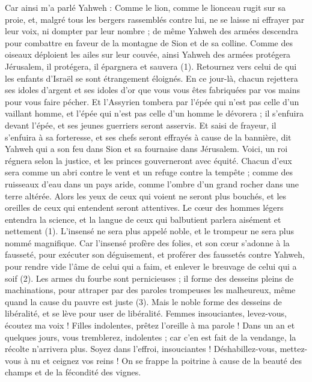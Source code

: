 \begin{multicols}{2}
{Car ainsi m'a parlé Yahweh : Comme le lion, comme le lionceau rugit sur sa proie, et, malgré tous les bergers rassemblés contre lui, ne se laisse ni effrayer par leur voix, ni dompter par leur nombre ; de même Yahweh des armées descendra pour combattre en faveur de la montagne de Sion et de sa colline.
Comme des oiseaux déploient les ailes sur leur couvée, ainsi Yahweh des armées protégera Jérusalem, il protégera, il épargnera et sauvera (1).
Retournez vers celui de qui les enfants d'Israël se sont étrangement éloignés.
En ce jour-là, chacun rejettera ses idoles d’argent et ses idoles d’or que vous vous êtes fabriquées par vos mains pour vous faire pécher.
Et l'Assyrien tombera par l'épée qui n’est pas celle d'un vaillant homme, et l'épée qui n'est pas celle d’un homme le dévorera ; il s'enfuira devant l'épée, et ses jeunes guerriers seront asservis.
Et saisi de frayeur, il s’enfuira à sa forteresse, et ses chefs seront effrayés à cause de la bannière, dit Yahweh qui a son feu dans Sion et sa fournaise dans Jérusalem.
\VerseOne{}Voici, un roi régnera selon la justice, et les princes gouverneront avec équité.
Chacun d’eux sera comme un abri contre le vent et un refuge contre la tempête ; comme des ruisseaux d'eau dans un pays aride, comme l'ombre d'un grand rocher dans une terre altérée.
Alors les yeux de ceux qui voient ne seront plus bouchés, et les oreilles de ceux qui entendent seront attentives.
Le cœur des hommes légers entendra la science, et la langue de ceux qui balbutient parlera aisément et nettement (1).
L’insensé ne sera plus appelé noble, et le trompeur ne sera plus nommé magnifique.
Car l’insensé profère des folies, et son cœur s’adonne à la fausseté, pour exécuter son déguisement, et proférer des faussetés contre Yahweh, pour rendre vide l'âme de celui qui a faim, et enlever le breuvage de celui qui a soif (2).
Les armes du fourbe sont pernicieuses ; il forme des desseins pleins de machinations, pour attraper par des paroles trompeuses les malheureux, même quand la cause du pauvre est juste (3).
Mais le noble forme des desseins de libéralité, et se lève pour user de libéralité.
Femmes insouciantes, levez-vous, écoutez ma voix ! Filles indolentes, prêtez l'oreille à ma parole !
Dans un an et quelques jours, vous tremblerez, indolentes ; car c’en est fait de la vendange, la récolte n’arrivera plus.
Soyez dans l’effroi, insouciantes ! Déshabillez-vous, mettez-vous à nu et ceignez vos reins !
On se frappe la poitrine à cause de la beauté des champs et de la fécondité des vignes.
}
\end{multicols}
